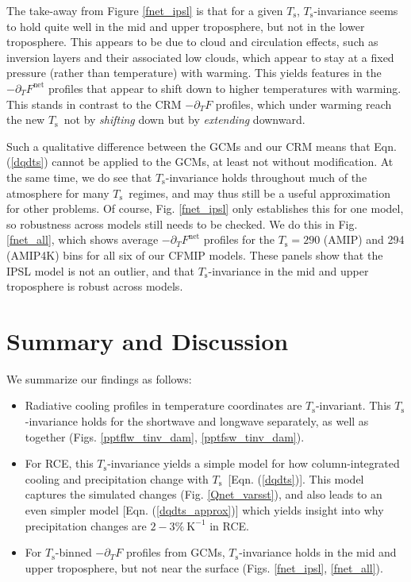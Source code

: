 \documentclass[10pt]{article}
\newcommand{\eqnref}[1]{(\ref{#1})}
\newcommand{\ppt}{\ensuremath{\partial_T}}
\newcommand{\Fnet}{\ensuremath{F^\mathrm{net}}}
\newcommand{\Ts}{\ensuremath{T_\mathrm{s}}}
\newcommand{\Kinverse}{\ensuremath{\mathrm{K^{-1}}}}
\begin{document}
The take-away from Figure \ref{fnet_ipsl} is that for a given \Ts, \Ts-invariance seems to hold quite well in the mid and upper troposphere, but not in the lower troposphere. This appears to be due to cloud and circulation  effects, such as inversion layers and their associated low clouds, which appear to stay at a fixed pressure (rather than temperature) with warming. This yields features in the $-\ppt \Fnet$ profiles that appear to shift down to higher temperatures with  warming. This stands in contrast to the CRM $-\ppt F$ profiles, which under warming reach the new \Ts\ not by \emph{shifting} down but by \emph{extending} downward. 

Such a qualitative difference between the GCMs and our CRM means that Eqn. \eqnref{dqdts} cannot be applied to the GCMs, at least not without modification. At the same time, we do see that \Ts-invariance holds throughout much of the atmosphere for many \Ts\ regimes, and may thus still be a useful approximation for other problems. Of course, Fig. \ref{fnet_ipsl} only establishes this for one model, so robustness across models still needs to be checked. We do this in Fig. \ref{fnet_all}, which shows average $-\ppt \Fnet$ profiles for the $\Ts= 290$ (AMIP) and 294 (AMIP4K) bins  for all six of our  CFMIP models. These panels show that the IPSL model is not an outlier, and that \Ts-invariance in the mid and upper troposphere is robust across models.


\section{Summary and Discussion}
We summarize our findings as follows:
	\begin{itemize}
		\item Radiative cooling profiles in temperature coordinates are  \Ts-invariant. This \Ts-invariance holds for the shortwave and longwave separately, as well as together (Figs. \ref{pptflw_tinv_dam}, \ref{pptfsw_tinv_dam}).
		\item For RCE, this \Ts-invariance yields a simple model for how column-integrated cooling and  precipitation change with \Ts\ [Eqn. \eqnref{dqdts}]. This model captures the simulated changes (Fig. \ref{Qnet_varsst}), and also leads to an even simpler model [Eqn. \eqnref{dqdts_approx}] which yields insight into why precipitation changes are  $2 -3\%\ \Kinverse$ in RCE.
		\item For \Ts-binned $-\ppt F$ profiles from GCMs, \Ts-invariance holds in the mid and upper troposphere, but not near the surface (Figs. \ref{fnet_ipsl}, \ref{fnet_all}).
	\end{itemize}
		
\end{document}

